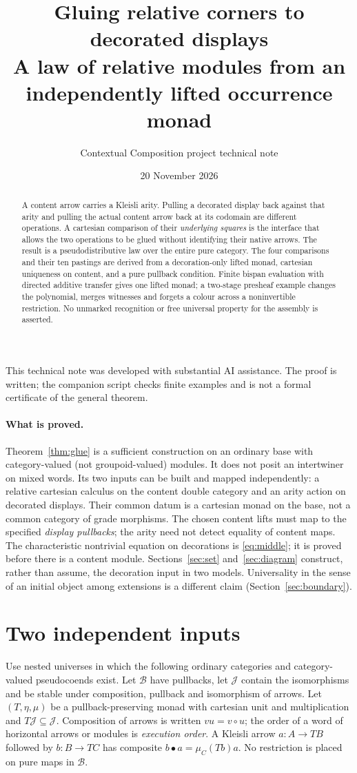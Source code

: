 \documentclass[11pt]{article}
\title{Gluing relative corners to decorated displays\\
\large A law of relative modules from an independently lifted occurrence monad}
\author{Contextual Composition project technical note}\date{20 November 2026}
\theoremstyle{definition}\newtheorem{definition}[theorem]{Definition}
\newcommand{\B}{\mathcal B}\newcommand{\J}{\mathcal J}
\begin{document}
\maketitle
\noindent This technical note was developed with substantial AI assistance.
The proof is written; the companion script checks finite examples and is not
a formal certificate of the general theorem.
\begin{abstract}
A content arrow carries a Kleisli arity. Pulling a decorated display
back against that arity and pulling the actual content arrow back at
its codomain are different operations. A cartesian comparison of
their \emph{underlying squares} is the interface that allows the
two operations to be glued without identifying their native arrows.
The result is a pseudodistributive law over the entire pure category.
The four comparisons and their ten pastings are derived from a
decoration-only lifted monad, cartesian uniqueness on content, and
a pure pullback condition. Finite bispan evaluation with directed
additive transfer gives one lifted monad; a two-stage presheaf
example changes the polynomial, merges witnesses and forgets a
colour across a noninvertible restriction. No unmarked recognition
or free universal property for the assembly is asserted.
\end{abstract}

\paragraph{What is proved.}
Theorem~\ref{thm:glue} is a sufficient construction on an ordinary base
with category-valued (not groupoid-valued) modules. It does not posit an
intertwiner on mixed words. Its two inputs can be built and mapped
independently: a relative cartesian calculus on the content double
category and an arity action on decorated displays. Their common datum is
a cartesian monad on the base, not a common category of grade morphisms.
The chosen content lifts must map to the specified \emph{display
pullbacks}; the arity need not detect equality of content maps.
The characteristic nontrivial equation on decorations is
\eqref{eq:middle}; it is proved before there is a content module.
Sections~\ref{sec:set} and~\ref{sec:diagram} construct, rather than
assume, the decoration input in two models. Universality in the sense
of an initial object among extensions is a different claim
(Section~\ref{sec:boundary}).

\section{Two independent inputs}\label{sec:inputs}
Use nested universes in which the following ordinary categories and
category-valued pseudocoends exist. Let $\B$ have pullbacks, let $\J$
contain the isomorphisms and be stable under composition, pullback
and isomorphism of arrows. Let $(T,\eta,\mu)$ be a pullback-preserving
monad with cartesian unit and multiplication and $T\J\subseteq\J$.
Composition of arrows is written $vu=v\circ u$; the order of a word
of horizontal arrows or modules is \emph{execution order}. A Kleisli
arrow $a:A\to TB$ followed by $b:B\to TC$ has composite
$b\bullet a=\mu_C(Tb)a$. No restriction is placed on pure maps in $\B$.
\end{document}

